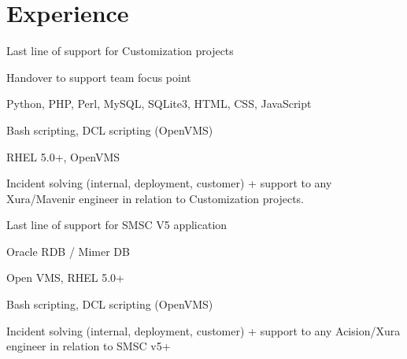 \documentclass[letterpaper]{deedy-resume.en} %
\begin{document}
\begin{minipage}[t]{0.60\textwidth} %

\section{Experience}

\vspace{\topsep} %
\begin{tightitemize}
\item Last line of support for Customization projects
\item Handover to support team focus point
\item Python, PHP, Perl, MySQL, SQLite3, HTML, CSS, JavaScript
\item Bash scripting, DCL scripting (OpenVMS)
\item RHEL 5.0+, OpenVMS
\item Incident solving (internal, deployment, customer) + support to any Xura/Mavenir engineer in relation to Customization projects.
\end{tightitemize}

\sectionspace %



\begin{tightitemize}
\item Last line of support for SMSC V5 application
\item Oracle RDB / Mimer DB
\item Open VMS, RHEL 5.0+
\item Bash scripting, DCL scripting (OpenVMS)
\item Incident solving (internal, deployment, customer) + support to any Acision/Xura engineer in relation to SMSC v5+
\end{tightitemize}

\sectionspace %


\end{minipage}
\end{document}
